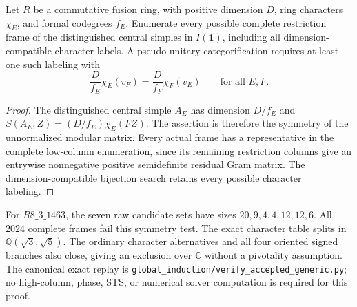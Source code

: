 \begin{proposition}
Let $R$ be a commutative fusion ring, with positive dimension $D$, ring
characters $\chi_E$, and formal codegrees $f_E$. Enumerate every possible
complete restriction frame of the distinguished central simples in
$I(\mathbf1)$, including all dimension-compatible character labels.
A pseudo-unitary categorification requires at least one such labeling
with
\[
  \frac{D}{f_E}\chi_E(v_F)=\frac{D}{f_F}\chi_F(v_E)
  \qquad\text{for all }E,F.
\]
\end{proposition}
\begin{proof}
The distinguished central simple $A_E$ has dimension $D/f_E$ and
$S(A_E,Z)=(D/f_E)\chi_E(FZ)$\cite[Lemma~4.3 and Corollary~4.5]{DeshpandeCenter}. The assertion is therefore the symmetry
of the unnormalized modular matrix. Every actual frame has a
representative in the complete low-column enumeration, since its
remaining restriction columns give an entrywise nonnegative positive
semidefinite residual Gram matrix. The dimension-compatible bijection
search retains every possible character labeling.
\end{proof}

For $R8\_3\_1463$, the seven raw candidate sets have sizes
$20,9,4,4,12,12,6$. All $2024$ complete frames fail this symmetry test.
The exact character table splits in $\mathbb Q(\sqrt3,\sqrt5)$.
The ordinary character alternatives and all four oriented signed
branches also close, giving an exclusion over $\mathbb C$ without a
pivotality assumption. The canonical exact replay is
\texttt{global\_induction/verify\_accepted\_generic.py}; no high-column,
phase, STS, or numerical solver computation is required for this proof.
